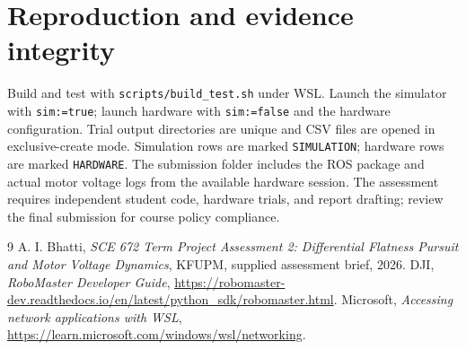 \documentclass[11pt,a4paper]{article}
\begin{document}
\section{Reproduction and evidence integrity}
Build and test with \texttt{scripts/build\_test.sh} under WSL. Launch the simulator with \texttt{sim:=true}; launch hardware with \texttt{sim:=false} and the hardware configuration. Trial output directories are unique and CSV files are opened in exclusive-create mode. Simulation rows are marked \texttt{SIMULATION}; hardware rows are marked \texttt{HARDWARE}. The submission folder includes the ROS package and actual motor voltage logs from the available hardware session. The assessment requires independent student code, hardware trials, and report drafting; review the final submission for course policy compliance.

\begin{thebibliography}{9}
 A. I. Bhatti, \emph{SCE 672 Term Project Assessment 2: Differential Flatness Pursuit and Motor Voltage Dynamics}, KFUPM, supplied assessment brief, 2026.
 DJI, \emph{RoboMaster Developer Guide}, \url{https://robomaster-dev.readthedocs.io/en/latest/python_sdk/robomaster.html}.
 Microsoft, \emph{Accessing network applications with WSL}, \url{https://learn.microsoft.com/windows/wsl/networking}.
\end{thebibliography}
\end{document}

